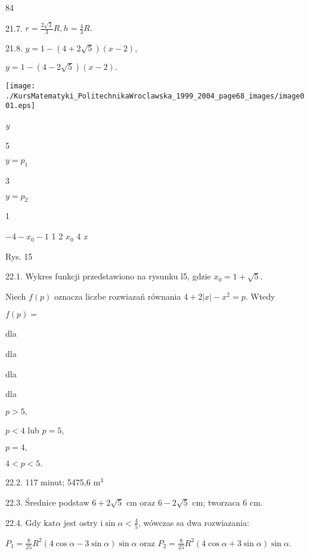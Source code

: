 \documentclass[a4paper,12pt]{article}
\begin{document}
84

21.7. $r=\displaystyle \frac{2\sqrt{2}}{3}R, h=\displaystyle \frac{4}{3}R.$

21.8. $y=1-(4+2\sqrt{5})(x-2),$

$y=1-(4-2\sqrt{5})(x-2).$
\begin{center}
\texttt{[image: ./KursMatematyki\_PolitechnikaWroclawska\_1999\_2004\_page68\_images/image001.eps]}
\end{center}
{\it y}

5

$y=p_{1}$

3

$y=p_{2}$

1

$-4  -x_{0}  -1$  1 2  $x_{0}$  4 {\it x}

Rys. 15

22.1. Wykres funkcji przedstawiono na rysunku l5, gdzie $x_{0}=1+\sqrt{5}.$

Niech $f(p)$ oznacza liczbe rozwiazań równania $4+2|x|-x^{2}=p$. Wtedy

$f(p)=$

dla

dla

dla

dla

$p>5,$

$p<4$ lub $p=5,$

$p=4,$

$4<p<5.$

22.2. 117 minut; 5475,6 $\mathrm{m}^{3}$

22.3. Średnice podstaw $6+2\sqrt{5}$ cm oraz $6-2\sqrt{5}$ cm; tworzaca 6 cm.

22.4. Gdy $\mathrm{k}\mathrm{a}\mathrm{t}\alpha$ jest ostry $\mathrm{i}\sin\alpha < \displaystyle \frac{4}{5}$, wówczas sa dwa rozwiazania:

$ P_{1}=\displaystyle \frac{8}{25}R^{2}(4\cos\alpha-3\sin\alpha)\sin\alpha$ oraz $P_{2}=\displaystyle \frac{8}{25}R^{2}(4\cos\alpha+3\sin\alpha)\sin\alpha.$
\end{document}
